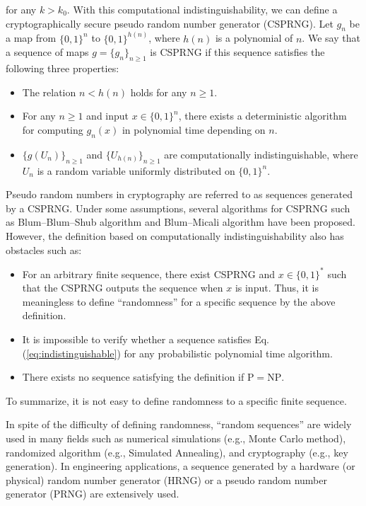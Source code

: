 for any $k>k_0$.
With this computational indistinguishability, we can define a cryptographically secure pseudo random number generator (CSPRNG). 
Let $g_n$ be a map from $\{0,1\}^n$ to $\{0,1\}^{h(n)}$, where $h(n)$ is a polynomial of $n$.
We say that a sequence of maps $g =\{g_n\}_{n\geq 1}$ is CSPRNG if this sequence satisfies the following three properties:
\begin{itemize}
	\item The relation $n < h(n)$ holds for any $n\geq 1$.
	\item For any $n\geq 1$ and input $x\in \{0,1\}^n$, there exists a deterministic algorithm for computing $g_n(x)$ in polynomial time depending on $n$.
	\item $\{g(U_n)\}_{n\geq 1}$ and $\{U_{h(n)}\}_{n\geq 1}$ are computationally indistinguishable, where $U_n$ is a random variable uniformly distributed on $\{0,1\}^n$.
\end{itemize}
Pseudo random numbers in cryptography are referred to as sequences generated by a CSPRNG. 
Under some assumptions, several algorithms for CSPRNG such as Blum--Blum--Shub algorithm \cite{blum1986simple} and Blum--Micali algorithm \cite{blum1984generate} have been proposed. 
However, the definition based on computationally indistinguishability also has obstacles such as:
\begin{itemize}
	\item For an arbitrary finite sequence, there exist CSPRNG and $x\in\{0,1\}^\ast$ such that the CSPRNG outputs the sequence when $x$ is input. Thus, it is meaningless to define ``randomness'' for a specific sequence by the above definition.
	\item It is impossible to verify whether a sequence satisfies Eq. (\ref{eq:indistinguishable}) for any probabilistic polynomial time algorithm.
	\item There exists no sequence satisfying the definition if $\mathrm{P}=\mathrm{NP}$.
\end{itemize}
To summarize, it is not easy to define randomness to a specific finite sequence.
%
\par
In spite of the difficulty of defining randomness, ``random sequences'' are widely used in many fields such as numerical simulations (e.g., Monte Carlo method), randomized algorithm (e.g., Simulated Annealing), and cryptography (e.g., key generation). 
In engineering applications, a sequence generated by a hardware (or physical) random number generator (HRNG) or a pseudo random number generator (PRNG) are extensively used.
